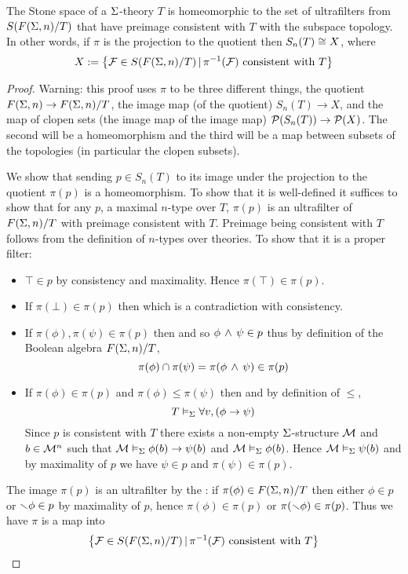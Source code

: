 \begin{prop}
    The Stone space of a $\Sigma$-theory $T$ is homeomorphic 
    to the set of ultrafilters from $S(F(\Sigma,n) / T)$ 
    that have preimage consistent with $T$ with the subspace topology.
    In other words, if $\pi$ is the projection to the quotient then
    $S_n(T) \cong X$, where
    \[X := 
    \left\{\mathcal{F} \in S(F(\Sigma,n) / T) \,|\, \pi^{-1}(\mathcal{F}) \text{ consistent with } T\right\}\]
\end{prop}
\begin{proof}
    Warning: this proof uses $\pi$ to be three different things,
    the quotient $F(\Sigma,n) \to F(\Sigma,n) / T$, 
    the image map (of the quotient) $S_n(T) \to X$, 
    and the map of clopen sets (the image map of the image map) 
    $\mathcal{P}(S_n(T)) \to \mathcal{P}(X)$.
    The second will be a homeomorphism and the third will be a map between
    subsets of the topologies (in particular the clopen subsets).

    We show that sending $p \in S_n(T)$ to its image under the projection 
    to the quotient $\pi(p)$ is a homeomorphism.
    To show that it is well-defined it suffices to show that for any $p$, a 
    maximal $n$-type over $T$, $\pi(p)$ is an ultrafilter of $F(\Sigma,n) / T$
    with preimage consistent with $T$.
    Preimage being consistent with $T$ 
    follows from the definition of $n$-types over theories.
    To show that it is a proper filter:
    \begin{itemize}
        \item $\top \in p$ by consistency and maximality. 
            Hence $\pi(\top) \in \pi(p)$.
        \item If $\pi(\bot) \in \pi(p)$ then
            which is a contradiction with consistency.
        \item If $\pi(\phi), \pi(\psi) \in \pi(p)$ then 
             and so
            $\phi \, \land \, \psi \in p$ thus by definition of the Boolean algebra 
            $F(\Sigma,n) / T$, 
            \[\pi(\phi) \cap \pi(\psi) = \pi(\phi \, \land \, \psi) \in \pi(p)\]
        \item If $\pi(\phi) \in \pi(p)$ and $\pi(\phi) \leq \pi(\psi)$ then 
            and by definition of $\leq$,
            \[T \vDash_{\Sigma} \forall v, (\phi \to \psi)\]
            Since $p$ is consistent with $T$ there exists a non-empty
            $\Sigma$-structure $\mathcal{M}$ and $b \in {\mathcal{M}}^n$ such that 
            $\mathcal{M} \vDash_{\Sigma} \phi(b) \to \psi(b)$ and $\mathcal{M} \vDash_{\Sigma} \phi(b)$.
            Hence $\mathcal{M} \vDash_{\Sigma} \psi(b)$ and by maximality of $p$ we have 
            $\psi \in p$ and $\pi(\psi) \in \pi(p)$.
    \end{itemize}
    The image $\pi(p)$ is an ultrafilter by the 
    :
    if $\pi(\phi) \in F(\Sigma,n) / T$ then either 
    $\phi \in p$ or $\smallsetminus \phi \in p$ by maximality of $p$, 
    hence $\pi(\phi) \in \pi(p)$ or $\pi(\smallsetminus \phi) \in \pi(p)$.
    Thus we have $\pi$ is a map into \[
    \left\{\mathcal{F} \in S(F(\Sigma,n) / T) \,|\, \pi^{-1}(\mathcal{F}) \text{ consistent with } T\right\}\]


\end{proof}
